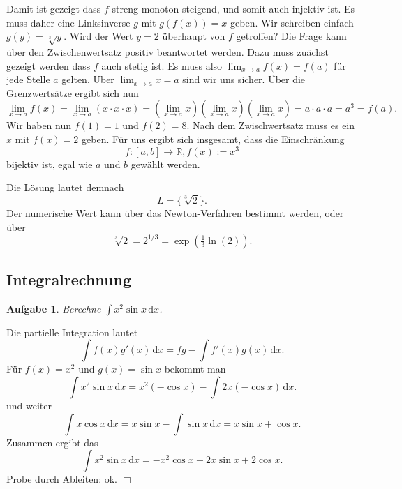 \documentclass[a4paper,10pt,fleqn,twoside]{scrartcl}
\numberwithin{equation}{section}
\newcommand{\R}{\mathbb R}
\newcommand{\strong}[1]{{\sf\bfseries #1}}
\theoremstyle{Aufgabe}
\newtheorem{Aufgabe}{\sffamily Aufgabe}[section]
\begin{document}
Damit ist gezeigt dass $f$ streng monoton steigend, und somit auch
injektiv ist. Es muss daher eine Linksinverse $g$ mit $g(f(x))=x$
geben. Wir schreiben einfach $g(y)=\sqrt[3]{y}$.
Wird der Wert $y=2$ überhaupt von $f$ getroffen? Die Frage kann
über den Zwischenwertsatz positiv beantwortet werden. Dazu muss
zuächst gezeigt werden dass $f$ auch stetig ist. Es muss also
$\lim_{x\to a}f(x)=f(a)$ für jede Stelle $a$ gelten. Über
$\lim_{x\to a} x = a$ sind wir uns sicher. Über die Grenzwertsätze ergibt
sich nun
\begin{equation}
\lim_{x\to a} f(x) = \lim_{x\to a} (x\cdot x\cdot x)
= (\lim_{x\to a} x)(\lim_{x\to a} x)(\lim_{x\to a} x)
= a\cdot a\cdot a = a^3 = f(a).
\end{equation}
Wir haben nun $f(1)=1$ und $f(2)=8$. Nach dem Zwischwertsatz
muss es ein $x$ mit $f(x)=2$ geben. Für uns ergibt sich insgesamt, dass
die Einschränkung
\begin{equation}
f\colon [a,b]\to\R, f(x):=x^3
\end{equation}
bijektiv ist, egal wie $a$ und $b$ gewählt werden.

Die Lösung lautet demnach
\begin{equation}
L = \{\sqrt[3]{2}\}.
\end{equation}
Der numerische Wert kann über das Newton-Verfahren bestimmt werden,
oder über
\begin{equation}
\sqrt[3]{2} = 2^{1/3} = \exp(\tfrac{1}{3}\ln(2)).
\end{equation}


\subsection{Integralrechnung}
\begin{Aufgabe}
Berechne $\displaystyle\int x^2\sin x\,\mathrm dx$.
\end{Aufgabe}
\noindent\strong{Lösung.}
Die partielle Integration lautet
\begin{equation}
\int f(x)g'(x)\,\mathrm dx = fg-\int f'(x)g(x)\,\mathrm dx.
\end{equation}
Für $f(x)=x^2$ und $g(x)=\sin x$ bekommt man
\begin{equation}
\int x^2\sin x\,\mathrm dx = x^2(-\cos x) - \int 2x(-\cos x)\,\mathrm dx.
\end{equation}
und weiter
\begin{equation}
\int x\cos x\,\mathrm dx = x\sin x - \int \sin x\,\mathrm dx = x\sin x + \cos x.
\end{equation}
Zusammen ergibt das
\begin{equation}
\int x^2\sin x\,\mathrm dx = -x^2\cos x +2x\sin x+2\cos x.
\end{equation}
Probe durch Ableiten: ok. $\Box$
\end{document}
